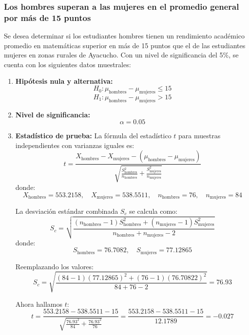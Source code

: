 \documentclass[
]{article}
\begin{document}
\subsubsection*{Los hombres superan a las mujeres en el promedio general
por más de 15
puntos}\label{los-hombres-superan-a-las-mujeres-en-el-promedio-general-por-muxe1s-de-15-puntos}

Se desea determinar si los estudiantes hombres tienen un rendimiento
académico promedio en matemáticas superior en más de 15 puntos que el de
las estudiantes mujeres en zonas rurales de Ayacucho. Con un nivel de
significancia del 5\%, se cuenta con los siguientes datos muestrales:

\begin{enumerate}
    \item \textbf{Hipótesis nula y alternativa:}
    \[
    H_0: \mu_{\text{hombres}} - \mu_{\text{mujeres}} \leq 15
    \]
    \[
    H_1: \mu_{\text{hombres}} - \mu_{\text{mujeres}} > 15
    \]

   \item \textbf{Nivel de significancia:}
    \[
    \alpha = 0.05
    \]

   \item \textbf{Estadístico de prueba:}
    La fórmula del estadístico \( t \) para muestras independientes con varianzas iguales es:
    \[
    t = \frac{X_{\text{hombres}} - X_{\text{mujeres}} - (\mu_{\text{hombres}} - \mu_{\text{mujeres}})}{\sqrt{\frac{S_{\text{hombres}}^2}{n_{\text{hombres}}} + \frac{S_{\text{mujeres}}^2}{n_{\text{mujeres}}}}}
    \]
    donde:
    \[
    X_{\text{hombres}} = 553.2158, \quad X_{\text{mujeres}} = 538.5511, \quad n_{\text{hombres}} = 76, \quad n_{\text{mujeres}} = 84
    \]

   La desviación estándar combinada \( S_c \) se calcula como:
    \[
    S_c = \sqrt{\frac{(n_{\text{hombres}} - 1) S_{\text{hombres}}^2 + (n_{\text{mujeres}} - 1) S_{\text{mujeres}}^2}{n_{\text{hombres}} + n_{\text{mujeres}} - 2}}
    \]
    donde:
    \[
    S_{\text{hombres}} = 76.7082, \quad S_{\text{mujeres}} = 77.12865
    \]

   Reemplazando los valores:
    \[
    S_c = \sqrt{\frac{(84 - 1) (77.12865)^2 + (76 - 1) (76.70822)^2}{84 + 76 - 2}} = 76.93
    \]

   Ahora hallamos \( t \):
    \[
    t = \frac{553.2158 - 538.5511 - 15}{\sqrt{\frac{76.93^2}{84} + \frac{76.93^2}{76}}} = \frac{553.2158 - 538.5511 - 15}{12.1789} = -0.027
    \]


\end{enumerate}
\end{document}
